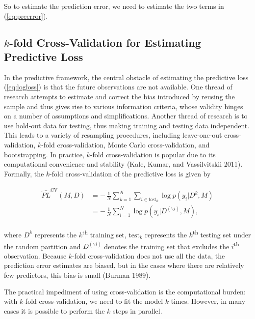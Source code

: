 So to estimate the prediction error, we need to estimate the two terms
in (\ref{eq:preerror}).

\subsection{\texorpdfstring{\(k\)-fold Cross-Validation for Estimating
Predictive
Loss}{k-fold Cross-Validation for Estimating Predictive Loss}}\label{k-fold-cross-validation-for-estimating-predictive-loss}

In the predictive framework, the central obstacle of estimating the
predictive loss (\ref{eq:logloss}) is that the future observations are
not available. One thread of research attempts to estimate and correct
the bias introduced by reusing the sample and thus gives rise to various
information criteria, whose validity hinges on a number of assumptions
and simplifications. Another thread of research is to use hold-out data
for testing, thus making training and testing data independent. This
leads to a variety of resampling procedures, including leave-one-out
cross-validation, \(k\)-fold cross-validation, Monte Carlo
cross-validation, and bootstrapping. In practice, \(k\)-fold
cross-validation is popular due to its computational convenience and
stability (Kale, Kumar, and Vassilvitskii 2011). Formally, the
\(k\)-fold cross-validation of the predictive loss is given by

\begin{align}
\begin{split}
  \label{eq:xvalesti}
  \widehat{PL}^{\text{CV}}(M, D) &=-\,\frac{1}{N}\sum_{k=1}^K\sum_{i\in
    \text{test}_k}\log p(y_i|D^k, M)\\
  &=-\,\frac{1}{N}\sum_{i=1}^N\log
  p(y_i|D^{(\backslash i)}, M),
\end{split}
\end{align}

\noindent where \(D^k\) represents the \(k\)\textsuperscript{th}
training set, \(\text{test}_k\) represents the \(k\)\textsuperscript{th}
testing set under the random partition and \(D^{(\backslash i)}\)
denotes the training set that excludes the \(i\)\textsuperscript{th}
observation. Because \(k\)-fold cross-validation does not use all the
data, the prediction error estimates are biased, but in the cases where
there are relatively few predictors, this bias is small (Burman 1989).

The practical impediment of using cross-validation is the computational
burden: with \(k\)-fold cross-validation, we need to fit the model \(k\)
times. However, in many cases it is possible to perform the \(k\) steps
in parallel.

